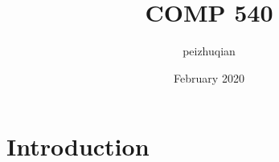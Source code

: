 \documentclass{article}
\title{COMP 540}
\author{peizhuqian }
\date{February 2020}
\begin{document}
\maketitle

\section{Introduction}
\end{document}
